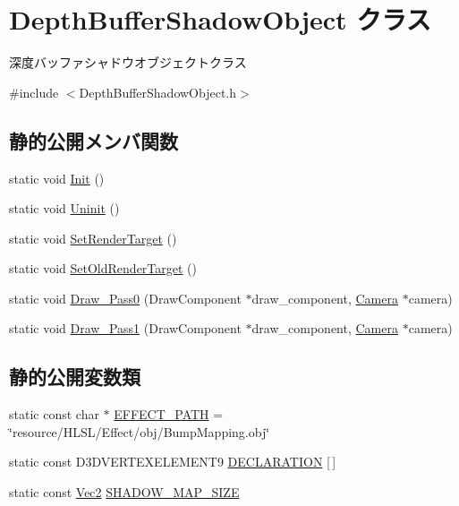 \hypertarget{class_depth_buffer_shadow_object}{}\section{Depth\+Buffer\+Shadow\+Object クラス}
\label{class_depth_buffer_shadow_object}


深度バッファシャドウオブジェクトクラス  




{\ttfamily \#include $<$Depth\+Buffer\+Shadow\+Object.\+h$>$}

\subsection*{静的公開メンバ関数}
\begin{DoxyCompactItemize}
\item 
static void \mbox{\hyperlink{class_depth_buffer_shadow_object_a03e23f51e5e68babc7a1a42d0fedfba0}{Init}} ()
\item 
static void \mbox{\hyperlink{class_depth_buffer_shadow_object_a6f5e6542143cffef6b7a9e69f6c9cd94}{Uninit}} ()
\item 
static void \mbox{\hyperlink{class_depth_buffer_shadow_object_ac575084492645de134c6f1990ed7d2dc}{Set\+Render\+Target}} ()
\item 
static void \mbox{\hyperlink{class_depth_buffer_shadow_object_a2ac079b069c8f60b8d681868b9afce89}{Set\+Old\+Render\+Target}} ()
\item 
static void \mbox{\hyperlink{class_depth_buffer_shadow_object_a7916c03b90a01c71a9050e721cf6810c}{Draw\+\_\+\+Pass0}} (Draw\+Component $\ast$draw\+\_\+component, \mbox{\hyperlink{class_camera}{Camera}} $\ast$camera)
\item 
static void \mbox{\hyperlink{class_depth_buffer_shadow_object_a4bf8a72a447aa6ff150f3fef630ab448}{Draw\+\_\+\+Pass1}} (Draw\+Component $\ast$draw\+\_\+component, \mbox{\hyperlink{class_camera}{Camera}} $\ast$camera)
\end{DoxyCompactItemize}
\subsection*{静的公開変数類}
\begin{DoxyCompactItemize}
\item 
static const char $\ast$ \mbox{\hyperlink{class_depth_buffer_shadow_object_aaa0b1c0ca424614c5cf7368f00fa5fa0}{E\+F\+F\+E\+C\+T\+\_\+\+P\+A\+TH}} = \char`\"{}resource/H\+L\+SL/Effect/obj/Bump\+Mapping.\+obj\char`\"{}
\item 
static const D3\+D\+V\+E\+R\+T\+E\+X\+E\+L\+E\+M\+E\+N\+T9 \mbox{\hyperlink{class_depth_buffer_shadow_object_a9238d9843ca8654d67809dfbd5600137}{D\+E\+C\+L\+A\+R\+A\+T\+I\+ON}} \mbox{[}$\,$\mbox{]}
\item 
static const \mbox{\hyperlink{_vector3_d_8h_a5ef6e95dfc5f9d3820b71772d99bbc25}{Vec2}} \mbox{\hyperlink{class_depth_buffer_shadow_object_aa7a8ac55e3de545dacb0cfde57fd1017}{S\+H\+A\+D\+O\+W\+\_\+\+M\+A\+P\+\_\+\+S\+I\+ZE}}
\end{DoxyCompactItemize}


